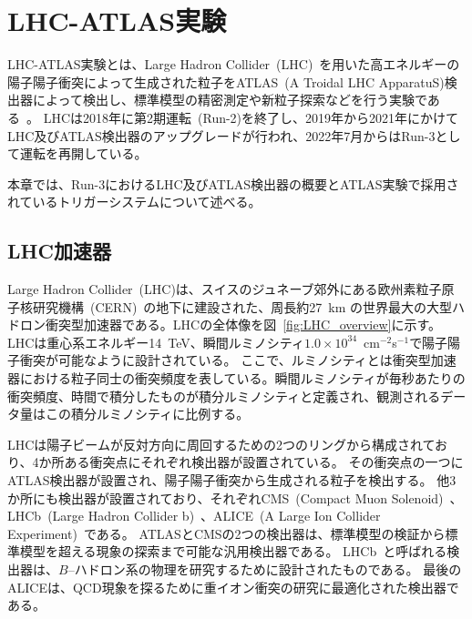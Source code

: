 \chapter{LHC-ATLAS実験}\label{chapter2}

LHC-ATLAS実験とは、Large Hadron Collider~(LHC)~\cite{article:LHC}を用いた高エネルギーの陽子陽子衝突によって生成された粒子をATLAS~(A Troidal LHC ApparatuS)検出器によって検出し、標準模型の精密測定や新粒子探索などを行う実験である~\cite{Aad:1129811}。
LHCは2018年に第2期運転~(Run-2)を終了し、2019年から2021年にかけてLHC及びATLAS検出器のアップグレードが行われ、2022年7月からはRun-3として運転を再開している。

本章では、Run-3におけるLHC及びATLAS検出器の概要とATLAS実験で採用されているトリガーシステムについて述べる。

\section{LHC加速器}
\label{section2-1}
Large Hadron Collider~(LHC)は、スイスのジュネーブ郊外にある欧州素粒子原子核研究機構~(CERN)~\cite{article:CERN}の地下に建設された、周長約27~km の世界最大の大型ハドロン衝突型加速器である。LHCの全体像を図~\ref{fig:LHC_overview}に示す。
LHCは重心系エネルギー14~TeV、瞬間ルミノシティ$1.0\times10^{34}$~cm$^{-2}$s$^{-1}$で陽子陽子衝突が可能なように設計されている。
ここで、ルミノシティとは衝突型加速器における粒子同士の衝突頻度を表している。瞬間ルミノシティが毎秒あたりの衝突頻度、時間で積分したものが積分ルミノシティと定義され、観測されるデータ量はこの積分ルミノシティに比例する。

LHCは陽子ビームが反対方向に周回するための2つのリングから構成されており、4か所ある衝突点にそれぞれ検出器が設置されている。
その衝突点の一つにATLAS検出器が設置され、陽子陽子衝突から生成される粒子を検出する。
他3か所にも検出器が設置されており、それぞれCMS~(Compact Muon Solenoid)~\cite{article:CMSExperiment}、LHCb~(Large Hadron Collider b)~\cite{article:LHCbExperiment}、ALICE~(A Large Ion Collider Experiment)~\cite{article:ALICEExperiment}である。
ATLASとCMSの2つの検出器は、標準模型の検証から標準模型を超える現象の探索まで可能な汎用検出器である。
LHCb~と呼ばれる検出器は、$B$--ハドロン系の物理を研究するために設計されたものである。
最後のALICEは、QCD現象を探るために重イオン衝突の研究に最適化された検出器である。


